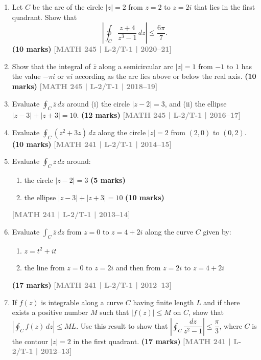 \documentclass[12pt,a4paper]{article}
\newcommand{\yr}[1]{\hfill\textcolor{gray}{\small\textbf{[#1]}}}
\newcommand{\mk}[1]{\textcolor{orange!70!black}{\small\textbf{(#1 marks)}}}
\begin{document}
\begin{enumerate}\item Let $C$ be the arc of the circle $|z|=2$ from $z=2$ to $z=2i$ that lies in the first quadrant. Show that
\[
\left|\oint_{C} \frac{z+4}{z^{3}-1}\,dz\right| \leq \frac{6\pi}{7}.
\]
\mk{10} \yr{MATH 245 | L-2/T-1 | 2020--21}

\item Show that the integral of $\bar{z}$ along a semicircular arc $|z|=1$ from $-1$ to $1$ has the value $-\pi i$ or $\pi i$ according as the arc lies above or below the real axis.
\mk{10} \yr{MATH 245 | L-2/T-1 | 2018--19}

\item Evaluate $\oint_{C}\bar{z}\,dz$ around (i) the circle $|z-2|=3$, and (ii) the ellipse $|z-3|+|z+3|=10$.
\mk{12} \yr{MATH 245 | L-2/T-1 | 2016--17}

\item Evaluate $\displaystyle\oint_{C}(z^{2}+3z)\,dz$ along the circle $|z|=2$ from $(2,0)$ to $(0,2)$.
\mk{10} \yr{MATH 241 | L-2/T-1 | 2014--15}

\item Evaluate $\oint_{C}\bar{z}\,dz$ around:
\begin{enumerate}
  \item the circle $|z-2|=3$ \mk{5}
  \item the ellipse $|z-3|+|z+3|=10$ \mk{10}
\end{enumerate}
\yr{MATH 241 | L-2/T-1 | 2013--14}

\item Evaluate $\displaystyle\int_{C} \bar{z}\,dz$ from $z=0$ to $z=4+2i$ along the curve $C$ given by:
\begin{enumerate}
  \item $z = t^{2}+it$
  \item the line from $z=0$ to $z=2i$ and then from $z=2i$ to $z=4+2i$
\end{enumerate}
\mk{17} \yr{MATH 241 | L-2/T-1 | 2012--13}

\item If $f(z)$ is integrable along a curve $C$ having finite length $L$ and if there exists a positive number $M$ such that $|f(z)|\le M$ on $C$, show that $\left|\oint_{C}f(z)\,dz\right|\le ML$. Use this result to show that $\left|\oint_{C}\dfrac{dz}{z^{2}-1}\right|\le \dfrac{\pi}{3}$, where $C$ is the contour $|z|=2$ in the first quadrant.
\mk{17} \yr{MATH 241 | L-2/T-1 | 2012--13}

\end{enumerate}
\end{document}
